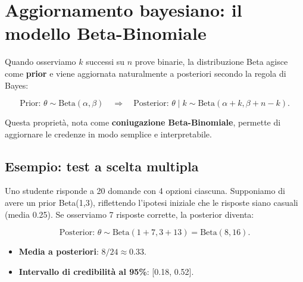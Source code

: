 \documentclass[
  letterpaper,
  DIV=11,
  numbers=noendperiod,
  oneside]{scrreprt}
\providecommand{\tightlist}{%
  \setlength{\itemsep}{0pt}\setlength{\parskip}{0pt}}
\theoremstyle{definition}
\theoremstyle{plain}
\theoremstyle{definition}
\theoremstyle{remark}
\begin{document}
\section{Aggiornamento bayesiano: il modello
Beta-Binomiale}\label{aggiornamento-bayesiano-il-modello-beta-binomiale}

Quando osserviamo \(k\) successi su \(n\) prove binarie, la
distribuzione Beta agisce come \textbf{prior} e viene aggiornata
naturalmente a posteriori secondo la regola di Bayes:

\[
\text{Prior: } \theta \sim \text{Beta}(\alpha, \beta) \quad \Rightarrow \quad \text{Posterior: } \theta \mid k \sim \text{Beta}(\alpha + k, \beta + n - k).
\]

Questa proprietà, nota come \textbf{coniugazione Beta-Binomiale},
permette di aggiornare le credenze in modo semplice e interpretabile.

\subsection{Esempio: test a scelta
multipla}\label{esempio-test-a-scelta-multipla}

Uno studente risponde a 20 domande con 4 opzioni ciascuna. Supponiamo di
avere un prior Beta(1,3), riflettendo l'ipotesi iniziale che le risposte
siano casuali (media 0.25). Se osserviamo 7 risposte corrette, la
posterior diventa:

\[
\text{Posterior: } \theta \sim \text{Beta}(1 + 7, 3 + 13) = \text{Beta}(8, 16).
\]

\begin{itemize}
\tightlist
\item
  \textbf{Media a posteriori}: \(8/24 \approx 0.33\).
\item
  \textbf{Intervallo di credibilità al 95\%}: {[}0.18, 0.52{]}.
\end{itemize}
\end{document}

